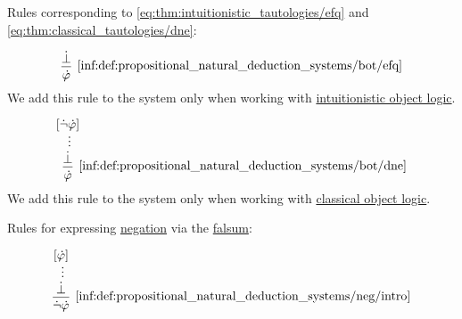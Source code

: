 \begin{definition}
\begin{thmenum}
     Rules corresponding to \eqref{eq:thm:intuitionistic_tautologies/efq} and \eqref{eq:thm:classical_tautologies/dne}:
    \begin{paracol}{2}
      \begin{leftcolumn}
        \leavevmode\vfill
        \begin{equation*}\taglabel[\logic{EFQ}]{inf:def:propositional_natural_deduction_systems/bot/efq}
          \begin{prooftree}
            \hypo{ \synbot }
            \infer1[\ref{inf:def:propositional_natural_deduction_systems/bot/efq}]{ \syn\varphi }
          \end{prooftree}
        \end{equation*}
        We add this rule to the system only when working with \hyperref[con:intuitionistic_logic]{intuitionistic object logic}.
      \end{leftcolumn}

      \begin{rightcolumn}
        \leavevmode\vfill
        \begin{equation*}\taglabel[\logic{DNE}]{inf:def:propositional_natural_deduction_systems/bot/dne}
          \begin{prooftree}
            \hypo{ [\synneg \syn\varphi] }
            \ellipsis {} { \synbot }
            \infer1[\ref{inf:def:propositional_natural_deduction_systems/bot/dne}]{ \syn\varphi }
          \end{prooftree}
        \end{equation*}
        We add this rule to the system only when working with \hyperref[con:classical_logic]{classical object logic}.
      \end{rightcolumn}
    \end{paracol}

     Rules for expressing \hyperref[def:propositional_alphabet/negation]{negation} via the \hyperref[def:propositional_alphabet/constants/falsum]{falsum}:
    \begin{paracol}{2}
      \begin{leftcolumn}
        \leavevmode\vfill
        \begin{equation*}\taglabel[\ensuremath{ \neg^+ }]{inf:def:propositional_natural_deduction_systems/neg/intro}
          \begin{prooftree}
            \hypo{ [\syn\varphi] }
            \ellipsis {} { \synbot }
            \infer1[\ref{inf:def:propositional_natural_deduction_systems/neg/intro}]{ \synneg \syn\varphi }
          \end{prooftree}
        \end{equation*}
      \end{leftcolumn}


\end{paracol}
\end{thmenum}
\end{definition}
